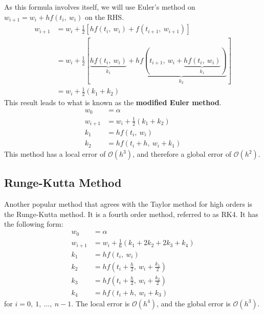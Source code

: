 \documentclass{article}
\begin{document}
As this formula involves itself, we will use Euler's method on
\(w_{i + 1} = w_i + h f\left( t_i,\: w_i \right)\) on the RHS\@.
\begin{align*}
    w_{i + 1} & = w_i + \frac{1}{2} \left[ h f\left( t_i,\: w_i \right) + f\left( t_{i + 1},\: w_{i + 1} \right) \right]                                                                                     \\
              & = w_i + \frac{1}{2} \left[ \underbrace{h f\left( t_i,\: w_i \right)}_{k_1} + \underbrace{h f\left( t_{i + 1},\: w_i + \underbrace{h f\left( t_i,\: w_i \right)}_{k_1} \right)}_{k_2} \right] \\
              & = w_i + \frac{1}{2} \left( k_1 + k_2 \right)
\end{align*}
This result leads to what is known as the \textbf{modified Euler method}.
\begin{align*}
    w_0       & = \alpha                                     \\
    w_{i + 1} & = w_i + \frac{1}{2} \left( k_1 + k_2 \right) \\
    k_1       & = h f\left( t_i,\: w_i \right)               \\
    k_2       & = h f\left( t_i + h,\: w_i + k_1 \right)
\end{align*}
This method has a local error of \(\mathcal{O}\left( h^3 \right)\), and therefore a global error of \(\mathcal{O}\left( h^2 \right)\).
\subsection{Runge-Kutta Method}
Another popular method that agrees with the Taylor method for high orders is the Runge-Kutta method.
It is a fourth order method, referred to as RK4. It has the following form:
\begin{align*}
    w_0 & = \alpha \\
    w_{i + 1} & = w_i + \frac{1}{6} \left( k_1 + 2 k_2 + 2 k_3 + k_4 \right) \\
    k_1 & = h f\left( t_i,\: w_i \right) \\
    k_2 & = h f\left( t_i + \frac{h}{2},\: w_i + \frac{k_1}{2} \right) \\
    k_3 & = h f\left( t_i + \frac{h}{2},\: w_i + \frac{k_2}{2} \right) \\
    k_4 & = h f\left( t_i + h,\: w_i + k_3 \right)
\end{align*}
for \(i = 0,\: 1,\: \ldots,\: n - 1\). The local error is \(\mathcal{O}\left( h^4 \right)\), and the global error is \(\mathcal{O}\left( h^3 \right)\).
\end{document}
